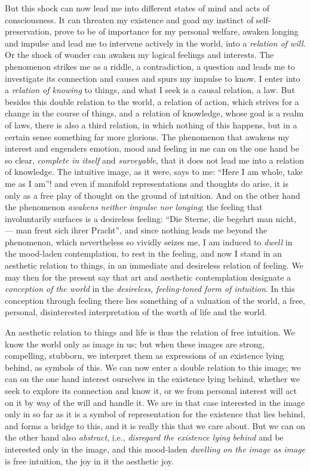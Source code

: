 \documentclass[12pt,a4paper,openany]{book}
\newcommand{\opage}[1]{\marginnote{\footnotesize\textit{[#1]}}}
\begin{document}
But this shock can now lead me into different states of mind and acts of consciousness.
It can threaten my existence and goad my instinct of self-preservation, prove to be of
importance for my personal welfare, awaken longing and impulse and lead me to intervene
actively in the world, into a \emph{relation of will}. Or the shock of wonder can awaken
my logical feelings and interests. The phenomenon strikes me as a riddle, a contradiction,
a question and leads me to investigate its connection and causes and spurs my impulse to
know. I enter into a \emph{relation of knowing} to things, and what I seek is a causal
relation, a law. But besides this double relation to the world, a relation of action,
which strives for a change in the course of things, and a relation of knowledge, whose
goal is a realm of laws, there is also a third relation, in which nothing of this happens,
but in a certain sense something far more glorious. The phenomenon that awakens my
interest and engenders emotion, mood and feeling in me can on the one hand be so clear,
\emph{complete in itself} and \emph{surveyable}, that it does not lead me into a relation
of knowledge. The intuitive image, as it were, says to me: ``Here I am whole, take me as I
am''! and even if manifold representations and thoughts do arise, it is only as a free
play of thought on the ground of intuition. And on the other hand the phenomenon
\emph{awakens} \emph{neither impulse nor longing}; the feeling that involuntarily
surfaces is a desireless feeling: ``Die Sterne, die begehrt man nicht, --- man freut sich
ihrer Pracht'', and since nothing leads me beyond the phenomenon, which nevertheless so
vividly seizes me, I am induced to \emph{dwell} in the mood-laden contemplation, to rest
in the feeling, and now
\setcounter{footnote}{0}%
\opage{261}I stand in an aesthetic relation to things, in an immediate and desireless relation
of feeling. We may then for the present say that art and aesthetic contemplation
designate a \emph{conception of the world} in the \emph{desireless, feeling-toned}
\emph{form of intuition}. In this conception through feeling there lies something of a
valuation of the world, a free, personal, disinterested interpretation of the worth of
life and the world.

An aesthetic relation to things and life is thus the relation of free intuition. We know
the world only as image in us; but when these images are strong, compelling, stubborn, we
interpret them as expressions of an existence lying behind, as symbols of this. We can now
enter a double relation to this image; we can on the one hand interest ourselves in the
existence lying behind, whether we seek to explore its connection and know it, or we from
personal interest will act on it by way of the will and handle it. We are in that case
interested in the image only in so far as it is a symbol of representation for the
existence that lies behind, and forms a bridge to this, and it is really this that we
care about. But we can on the other hand also \emph{abstract}, i.e., \emph{disregard the
existence lying behind} and be interested only in the image, and this mood-laden
\emph{dwelling on the image as image} is free intuition, the joy in it the aesthetic joy. %
\end{document}

